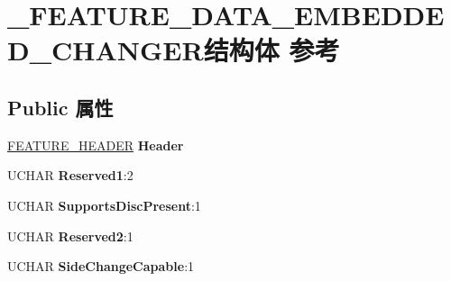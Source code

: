\hypertarget{struct___f_e_a_t_u_r_e___d_a_t_a___e_m_b_e_d_d_e_d___c_h_a_n_g_e_r}{}\section{\+\_\+\+F\+E\+A\+T\+U\+R\+E\+\_\+\+D\+A\+T\+A\+\_\+\+E\+M\+B\+E\+D\+D\+E\+D\+\_\+\+C\+H\+A\+N\+G\+E\+R结构体 参考}
\label{struct___f_e_a_t_u_r_e___d_a_t_a___e_m_b_e_d_d_e_d___c_h_a_n_g_e_r}
\subsection*{Public 属性}
\begin{DoxyCompactItemize}
\item 
\mbox{\label{struct___f_e_a_t_u_r_e___d_a_t_a___e_m_b_e_d_d_e_d___c_h_a_n_g_e_r_a16726f8d10943333063b96f83eb95d63}} 
\hyperlink{struct___f_e_a_t_u_r_e___h_e_a_d_e_r}{F\+E\+A\+T\+U\+R\+E\+\_\+\+H\+E\+A\+D\+ER} {\bfseries Header}
\item 
\mbox{\label{struct___f_e_a_t_u_r_e___d_a_t_a___e_m_b_e_d_d_e_d___c_h_a_n_g_e_r_a063f4e00481bf57035b3252a15821234}} 
U\+C\+H\+AR {\bfseries Reserved1}\+:2
\item 
\mbox{\label{struct___f_e_a_t_u_r_e___d_a_t_a___e_m_b_e_d_d_e_d___c_h_a_n_g_e_r_ad4aa0ee09cbd63bf6186207f282b9155}} 
U\+C\+H\+AR {\bfseries Supports\+Disc\+Present}\+:1
\item 
\mbox{\label{struct___f_e_a_t_u_r_e___d_a_t_a___e_m_b_e_d_d_e_d___c_h_a_n_g_e_r_a7ff7aabc91af52e504ae843e89edab08}} 
U\+C\+H\+AR {\bfseries Reserved2}\+:1
\item 
\mbox{\label{struct___f_e_a_t_u_r_e___d_a_t_a___e_m_b_e_d_d_e_d___c_h_a_n_g_e_r_a576679d7eba04937afe5967c070da29f}} 
U\+C\+H\+AR {\bfseries Side\+Change\+Capable}\+:1
\item 

\end{DoxyCompactItemize}
